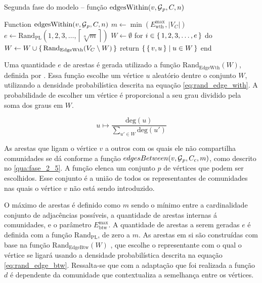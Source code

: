 \documentclass[notes.tex]{subfiles}
\begin{document}
\begin{quadro}[htbp]
\caption{Segunda fase do modelo -- função $\text{edgesWithin}(v, \operatorname{\mathcal{G}}_p, C, n)$}
\label{qua:fase_2_4}
\begin{algorithm}
Function $\text{edgesWithin}(v, \operatorname{\mathcal{G}}_p, C, n)$
    $m \leftarrow \min( E_\text{wth}^\text{max}, |V_C| )$
    $e \leftarrow \text{Rand}_\text{PL}({1, 2, 3, \ldots, \left\lceil  \sqrt[n]{m} \right\rceil})$
    $W \leftarrow \emptyset$
    for $i \in \set{1, 2, 3, \ldots, e}$ do $W\leftarrow W \cup \set{\text{Rand}_\text{EdgeWth}(V_C \setminus W)}$
    return $\set{\set{v, u} | u \in W}$
end
\end{algorithm}
\end{quadro}

Uma quantidade $e$ de arestas é gerada utilizado a função $\text{Rand}_\text{EdgeWth}(W)$, definida por .
Essa função escolhe um vértice $u$ aleatório dentre o conjunto $W$, utilizando a densidade probabilística descrita na equação \ref{eq:rand_edge_with}.
A probabilidade de escolher um vértice é proporcional a seu grau dividido pela soma dos graus em $W$.

\begin{equation}\label{eq:rand_edge_with}
    u \mapsto \frac{\text{deg}(u)}{\displaystyle\sum_{u' \in W}^{}\text{deg}(u')}
\end{equation}

As arestas que ligam o vértice $v$ a outros com os quais ele não compartilha comunidades se dá conforme a função $edgesBetween(v, \operatorname{\mathcal{G}}_p, C_c, m)$, como descrito no \autoref{qua:fase_2_5}.
A função elenca um conjunto $p$ de vértices que podem ser escolhidos.
Esse conjunto é a união de todos os representantes de comunidades nas quais o vértice $v$ não está sendo introduzido.

O máximo de arestas é definido como $m$ sendo o mínimo entre a cardinalidade conjunto de adjacências possíveis, a quantidade de arestas internas á comunidades, e o parâmetro $E_\text{btw}^\text{max}$.
A quantidade de arestas a serem geradas $e$ é  definida com a função $\text{Rand}_\text{PL}$, de zero a $m$.
As arestas em si são construídas com base na função $\text{Rand}_\text{EdgeBtw}(W)$ \cite{largeron2015generating}, que escolhe o representante com o qual o vértice se ligará usando a densidade probabilística descrita na equação \ref{eq:rand_edge_btw}.
Ressalta-se que com a adaptação que foi realizada a função $d$ é dependente da comunidade que contextualiza a semelhança entre os vértices.
\end{document}
